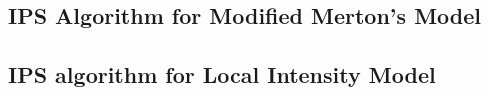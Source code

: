 \subsection{IPS Algorithm for Modified Merton's Model}

\subsection{IPS algorithm for Local Intensity Model}

